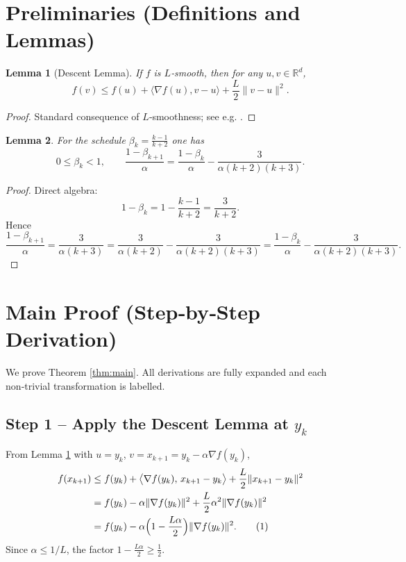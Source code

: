 \documentclass{article}
\newcommand{\R}{\mathbb{R}}
\newtheorem{lemma}{Lemma}
\begin{document}
\newpage
\section*{Preliminaries (Definitions and Lemmas)}
\begin{lemma}[Descent Lemma]\label{lem:descent}
If $f$ is $L$‑smooth, then for any $u,v\in\R^d$,
\[
f(v)\le f(u)+\langle\nabla f(u),v-u\rangle+\frac{L}{2}\|v-u\|^{2}.
\]
\end{lemma}
\begin{proof}
Standard consequence of $L$‑smoothness; see e.g. \cite{Nesterov2004}.
\end{proof}

\begin{lemma}\label{lem:beta}
For the schedule $\beta_k=\frac{k-1}{k+2}$ one has
\[
0\le\beta_k<1,\qquad
\frac{1-\beta_{k+1}}{\alpha}= \frac{1-\beta_k}{\alpha}-\frac{3}{\alpha(k+2)(k+3)}.
\]
\end{lemma}
\begin{proof}
Direct algebra:
\[
1-\beta_k = 1-\frac{k-1}{k+2}= \frac{3}{k+2}.
\]
Hence
\[
\frac{1-\beta_{k+1}}{\alpha}= \frac{3}{\alpha(k+3)}
= \frac{3}{\alpha(k+2)}-\frac{3}{\alpha(k+2)(k+3)}
= \frac{1-\beta_k}{\alpha}-\frac{3}{\alpha(k+2)(k+3)}.
\]
\end{proof}

\section*{Main Proof (Step‑by‑Step Derivation)}
We prove Theorem \ref{thm:main}. All derivations are fully expanded and each non‑trivial transformation is labelled.

\subsection*{Step 1 – Apply the Descent Lemma at $y_k$}
From Lemma \ref{lem:descent} with $u=y_k$, $v=x_{k+1}=y_k-\alpha\nabla f(y_k)$,
\begin{align}
f(x_{k+1})
&\le f(y_k)+\big\langle \nabla f(y_k),\,x_{k+1}-y_k\big\rangle
+\frac{L}{2}\|x_{k+1}-y_k\|^{2} \nonumber\\
&= f(y_k)-\alpha\|\nabla f(y_k)\|^{2}
+\frac{L}{2}\alpha^{2}\|\nabla f(y_k)\|^{2} \nonumber\\
&= f(y_k)-\alpha\Bigl(1-\frac{L\alpha}{2}\Bigr)\|\nabla f(y_k)\|^{2}.
\tag{1}
\end{align}
Since $\alpha\le 1/L$, the factor $1-\frac{L\alpha}{2}\ge \frac12$.
\end{document}
